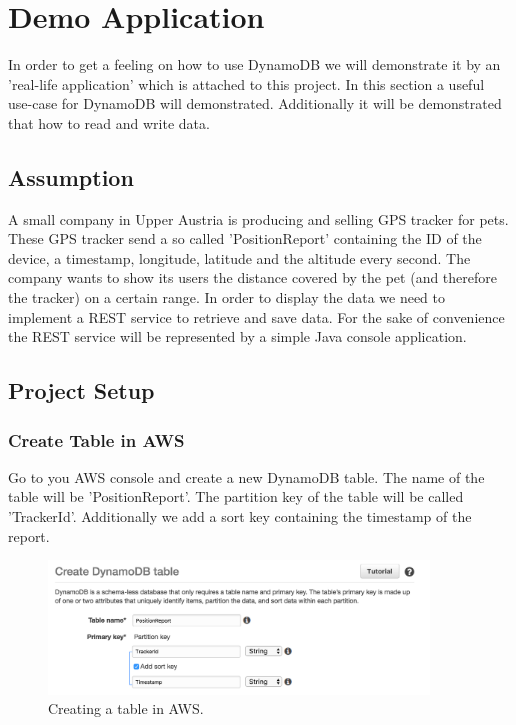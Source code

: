 \chapter{Demo Application}
In order to get a feeling on how to use DynamoDB we will demonstrate it by an 'real-life application' which is attached to this project. In this section a useful use-case for DynamoDB will demonstrated. Additionally it will be demonstrated that how to read and write data.

\section{Assumption}
A small company in Upper Austria is producing and selling GPS tracker for pets. These GPS tracker send a so called 'PositionReport' containing the ID of the device, a timestamp, longitude, latitude and the altitude every second. The company wants to show its users the distance covered by the pet (and therefore the tracker) on a certain range. In order to display the data we need to implement a REST service to retrieve and save data.
For the sake of convenience the REST service will be represented by a simple Java console application.

\section{Project Setup}
\subsection{Create Table in AWS}
Go to you AWS console and create a new DynamoDB table. The name of the table will be 'PositionReport'. The partition key of the table will be called 'TrackerId'. Additionally we add a sort key containing the timestamp of the report.

\begin{figure}[H]
\centering
\includegraphics[width=0.9\textwidth]{images/create_table.jpg}
\caption{Creating a table in AWS.}
\end{figure}

